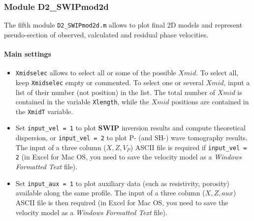 \documentclass[twoside,a4paper]{article}
\def\SWIP{\textbf{SWIP}}
\begin{document}
\subsubsection{Module D2\_SWIPmod2d}
The fifth module \verb|D2_SWIPmod2d.m| allows to plot final 2D models and represent pseudo-section of observed, calculated and residual phase velocities.

\paragraph{Main settings}
\begin{itemize}[leftmargin=*]
\setlength\itemsep{2ex}
\item \verb|Xmidselec| allows to select all or some of the possible $Xmid$. To select all, keep \verb|Xmidselec| empty or commented. To select one or several $Xmid$, input a list of their number (not position) in the list. The total number of $Xmid$ is contained in the variable \verb|Xlength|, while the $Xmid$ positions are contained in the \verb|XmidT| variable.

\item Set \verb|input_vel = 1| to plot {\SWIP} inversion results and compute theoretical dispersion, or \verb|input_vel = 2| to plot P- (and SH-) wave tomography results. The input of a three column ($X,Z,V_P$) ASCII file is required if \verb|input_vel = 2| (in Excel for Mac OS, you need to save the velocity model as a \textit{Windows Formatted Text} file).

\item Set \verb|input_aux = 1| to plot auxiliary data (such as resistivity, porosity) available along the same profile. The input of a three column ($X,Z,aux$) ASCII file is then required (in Excel for Mac OS, you need to save the velocity model as a \textit{Windows Formatted Text} file).
\end{itemize}
\end{document}
